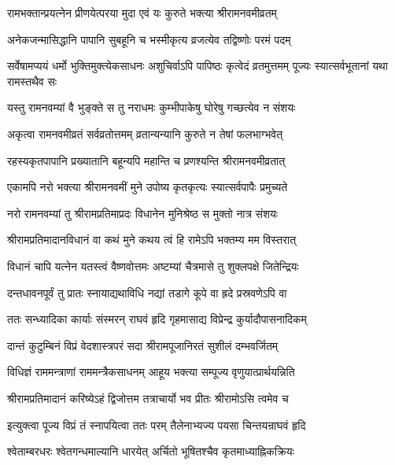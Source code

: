 \twolineshloka
{रामभक्तान्प्रयत्नेन प्रीणयेत्परया मुदा}
{एवं यः कुरुते भक्त्या श्रीरामनवमीव्रतम्}%

\twolineshloka
{अनेकजन्मासिद्धानि पापानि सुबहूनि च}
{भस्मीकृत्य व्रजत्येव तद्विष्णोः परमं पदम्}%

\threelineshloka
{सर्वेषामप्ययं धर्मो भुक्तिमुक्त्येकसाधनः}
{अशुचिर्वाऽपि पापिष्ठः कृत्वेदं व्रतमुत्तमम्}
{पूज्यः स्यात्सर्वभूतानां यथा रामस्तथैव सः}%

\twolineshloka
{यस्तु रामनवम्यां वै भुङ्क्ते स तु नराधमः}
{कुम्भीपाकेषु घोरेषु गच्छत्येव न संशयः}%

\twolineshloka
{अकृत्वा रामनवमीव्रतं सर्वव्रतोत्तमम्}
{व्रतान्यन्यानि कुरुते न तेषां फलभाग्भवेत्}%

\twolineshloka
{रहस्यकृतपापानि प्रख्यातानि बहून्यपि}
{महान्ति च प्रणश्यन्ति श्रीरामनवमीव्रतात्}%

\twolineshloka
{एकामपि नरो भक्त्या श्रीरामनवमीं मुने}
{उपोष्य कृतकृत्यः स्यात्सर्वपापैः प्रमुच्यते}%

\twolineshloka
{नरो रामनवम्यां तु श्रीरामप्रतिमाप्रदः}
{विधानेन मुनिश्रेष्ठ स मुक्तो नात्र संशयः}%

\twolineshloka
{श्रीरामप्रतिमादानविधानं वा कथं मुने}
{कथय त्वं हि रामेऽपि भक्तम्य मम विस्तरात्}%


\twolineshloka
{विधानं चापि यत्नेन यतस्त्वं वैष्णवोत्तमः}
{अष्टम्यां चैत्रमासे तु शुक्लपक्षे जितेन्द्रियः}%

\twolineshloka
{दन्तधावनपूर्वं तु प्रातः स्नायाद्यथाविधि}
{नद्यां तडागे कूपे वा ह्रदे प्रस्रवणेऽपि वा}%

\twolineshloka
{ततः सन्ध्यादिका कार्याः संस्मरन् राघवं हृदि}
{गृहमासाद्य विप्रेन्द्र कुर्यादौपासनादिकम्}%

\twolineshloka
{दान्तं कुटुम्बिनं विप्रं वेदशास्त्रपरं सदा}
{श्रीरामपूजानिरतं सुशीलं दम्भवर्जितम्}%

\twolineshloka
{विधिज्ञं राममन्त्राणां राममन्त्रैकसाधनम्}
{आहूय भक्त्या सम्पूज्य वृणुयात्प्रार्थयन्निति}%

\twolineshloka
{श्रीरामप्रतिमादानं करिष्येऽहं द्विजोत्तम}
{तत्राचार्यो भव प्रीतः श्रीरामोऽसि त्वमेव च}%

\twolineshloka
{इत्युक्त्वा पूज्य विप्रं तं स्नापयित्वा ततः परम्}
{तैलेनाभ्यज्य पयसा चिन्तयन्राघवं हृदि}%

\twolineshloka
{श्वेताम्बरधरः श्वेतगन्धमाल्यानि धारयेत्}
{अर्चितो भूषितश्चैव कृतमाध्याह्निकक्रियः}%

